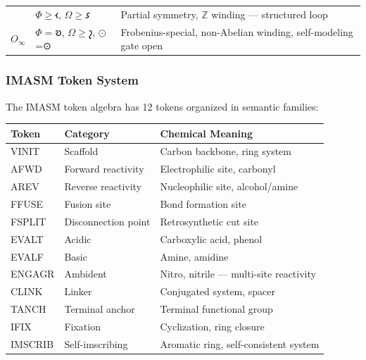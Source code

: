 \documentclass[12pt,a4paper]{article}
\begin{document}
\begin{longtable}[]{@{}lll@{}}
\begin{minipage}[t]{0.21\columnwidth}
\end{minipage} & \begin{minipage}[t]{0.39\columnwidth}\raggedright
\(\Phi \geq 𐑬\), \(\Omega \geq 𐑭\)\strut
\end{minipage} & \begin{minipage}[t]{0.32\columnwidth}\raggedright
Partial symmetry, \(\mathbb{Z}\) winding --- structured loop\strut
\end{minipage}\tabularnewline
\begin{minipage}[t]{0.21\columnwidth}\raggedright
\(O_∞\)\strut
\end{minipage} & \begin{minipage}[t]{0.39\columnwidth}\raggedright
\(\Phi = 𐑹\), \(\Omega \geq 𐑟\), \(\odot\)=⊙\strut
\end{minipage} & \begin{minipage}[t]{0.32\columnwidth}\raggedright
Frobenius-special, non-Abelian winding, self-modeling gate open\strut
\end{minipage}\tabularnewline
\bottomrule
\end{longtable}

\hypertarget{imasm-token-system}{%
\subsubsection{IMASM Token System}\label{imasm-token-system}}

The IMASM token algebra has 12 tokens organized in semantic families:

\begin{longtable}[]{@{}lll@{}}
\toprule
Token & Category & Chemical Meaning\tabularnewline
\midrule
\endhead
VINIT & Scaffold & Carbon backbone, ring system\tabularnewline
AFWD & Forward reactivity & Electrophilic site, carbonyl\tabularnewline
AREV & Reverse reactivity & Nucleophilic site,
alcohol/amine\tabularnewline
FFUSE & Fusion site & Bond formation site\tabularnewline
FSPLIT & Disconnection point & Retrosynthetic cut site\tabularnewline
EVALT & Acidic & Carboxylic acid, phenol\tabularnewline
EVALF & Basic & Amine, amidine\tabularnewline
ENGAGR & Ambident & Nitro, nitrile --- multi-site
reactivity\tabularnewline
CLINK & Linker & Conjugated system, spacer\tabularnewline
TANCH & Terminal anchor & Terminal functional group\tabularnewline
IFIX & Fixation & Cyclization, ring closure\tabularnewline
IMSCRIB & Self-imscribing & Aromatic ring, self-consistent
system\tabularnewline
\bottomrule
\end{longtable}
\end{document}
